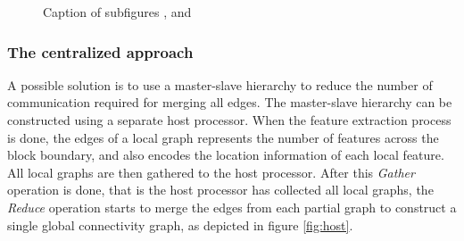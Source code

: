 \documentclass[10pt, conference, compsocconf]{IEEEtran}
\begin{document}
\begin{figure}[ht]
  \centering
  \caption[Optional caption for list of figures]{Caption of subfigures ,  and }
\end{figure}

\subsubsection{The centralized approach}

A possible solution is to use a master-slave hierarchy to reduce the number of communication required for merging all edges. The master-slave hierarchy can be constructed using a separate host processor. When the feature extraction process is done, the edges of a local graph represents the number of features across the block boundary, and also encodes the location information of each local feature. All local graphs are then gathered to the host processor. After this \emph{Gather} operation is done, that is the host processor has collected all local graphs, the \emph{Reduce} operation starts to merge the edges from each partial graph to construct a single global connectivity graph, as depicted in figure \ref{fig:host}.
\end{document}
